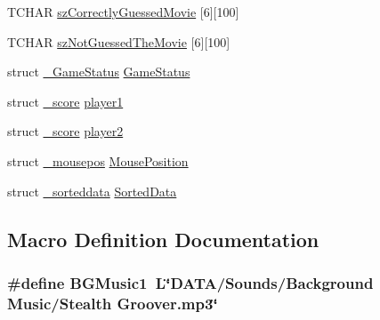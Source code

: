 \begin{DoxyCompactItemize}
\item 
T\+C\+H\+A\+R \hyperlink{_b_o_w-a_01film_01guessing_01game_8cpp_a0a386db4a3ed62a1602a49a18987223e}{sz\+Correctly\+Guessed\+Movie} \mbox{[}6\mbox{]}\mbox{[}100\mbox{]}
\item 
T\+C\+H\+A\+R \hyperlink{_b_o_w-a_01film_01guessing_01game_8cpp_a405b15b25b866dd610f5c107ded83b8e}{sz\+Not\+Guessed\+The\+Movie} \mbox{[}6\mbox{]}\mbox{[}100\mbox{]}
\item 
struct \hyperlink{struct___game_status}{\+\_\+\+Game\+Status} \hyperlink{_b_o_w-a_01film_01guessing_01game_8cpp_ada08e0af48b69529004bed6d4f440da3}{Game\+Status}
\item 
struct \hyperlink{struct__score}{\+\_\+score} \hyperlink{_b_o_w-a_01film_01guessing_01game_8cpp_a4a97c77b5f6013b6bd9fc8ce9f47ffbb}{player1}
\item 
struct \hyperlink{struct__score}{\+\_\+score} \hyperlink{_b_o_w-a_01film_01guessing_01game_8cpp_a91fde0a0b415b1de76a040339624fcd0}{player2}
\item 
struct \hyperlink{struct__mousepos}{\+\_\+mousepos} \hyperlink{_b_o_w-a_01film_01guessing_01game_8cpp_ad452c12766db219c3783b0996eeaa4b5}{Mouse\+Position}
\item 
struct \hyperlink{struct__sorteddata}{\+\_\+sorteddata} \hyperlink{_b_o_w-a_01film_01guessing_01game_8cpp_ab817d711a9f15bd907c455a2d29a06d7}{Sorted\+Data}
\end{DoxyCompactItemize}


\subsection{Macro Definition Documentation}
\hypertarget{_b_o_w-a_01film_01guessing_01game_8cpp_a326907179945bd20ec3bbf3c44880151}{}
\subsubsection[{B\+G\+Music1}]{\setlength{\rightskip}{0pt plus 5cm}\#define B\+G\+Music1~L\char`\"{}D\+A\+T\+A/Sounds/Background Music/Stealth Groover.\+mp3\char`\"{}}\label{_b_o_w-a_01film_01guessing_01game_8cpp_a326907179945bd20ec3bbf3c44880151}
\hypertarget{_b_o_w-a_01film_01guessing_01game_8cpp_a7e4f5ce398c929d5f803303c5ecca704}{}
